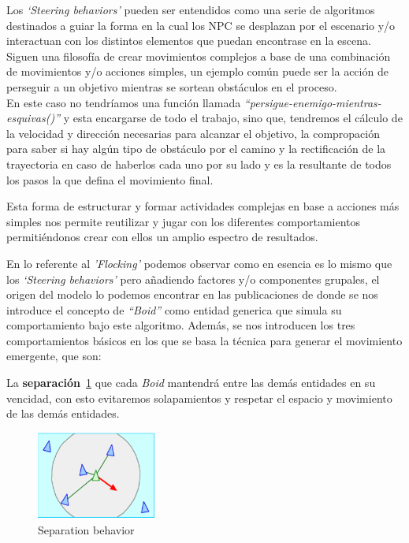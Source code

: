 Los \textit{`Steering behaviors'} pueden ser entendidos como una serie de algoritmos
destinados a guiar la forma en la cual los \ac{NPC} se desplazan por el escenario
y/o interactuan con los distintos elementos que puedan encontrase en la escena. Siguen
una filosofía de crear movimientos complejos a base de una combinación de movimientos 
y/o acciones simples, un ejemplo común puede ser la acción de perseguir a un objetivo
mientras se sortean obstáculos en el proceso. \\ 
En este caso no tendríamos una función llamada 
\textit{``persigue-enemigo-mientras-esquivas()''} y esta encargarse de todo el 
trabajo, sino que, tendremos el cálculo de la velocidad y dirección necesarias para
alcanzar el objetivo, la compropación para saber si hay algún tipo de
obstáculo por el camino y la rectificación de la trayectoria en caso de
haberlos cada uno por su lado y es la resultante de todos los pasos la que defina el
movimiento final.

Esta forma de estructurar y formar actividades complejas en base a acciones más simples
nos permite reutilizar y jugar con los diferentes comportamientos permitiéndonos crear
con ellos un amplio espectro de resultados.

En lo referente al \textit{'Flocking'} podemos observar como en esencia es lo mismo que
los \textit{`Steering behaviors'} pero añadiendo factores y/o componentes grupales,
el origen del modelo lo podemos encontrar en las publicaciones de \cite{Boids1986} donde
se nos introduce el concepto de \textit{``Boid''} como entidad generica que simula su
comportamiento bajo este algoritmo. Además, se nos introducen los tres comportamientos
básicos en los que se basa la técnica para generar el movimiento emergente, que son:

La \textbf{separación}~\ref{img:separation-b} que cada \textit{Boid} mantendrá entre
las demás entidades en su vencidad, con esto evitaremos solapamientos y respetar el
espacio y movimiento de las demás entidades.

\begin{figure}[ht]
\centering
\includegraphics[width=0.35\textwidth]{imagenes/marco_teo/separation.png}
\caption{Separation behavior}
\label{img:separation-b}
\end{figure}

